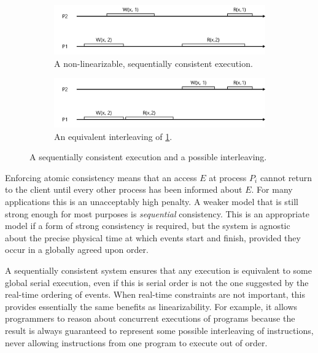 \documentclass[]             %
{NASA}                       %
\theoremstyle{definition}
\begin{document}
\begin{figure}
     \begin{subfigure}[a]{1\textwidth}
         \center
         \includegraphics[scale=0.4]{images/sequential1.png}
         \caption{A non-linearizable, sequentially consistent execution.}
         \label{fig:sequential1}
     \end{subfigure}
     \begin{subfigure}[b]{1\textwidth}
         \center
         \includegraphics[scale=0.4]{images/sequential2.png}
         \caption{An equivalent interleaving of \ref{fig:sequential1}.}
         \label{fig:interleaving1}
     \end{subfigure}
     \caption{A sequentially consistent execution and a possible interleaving.}
     \label{fig:sequential}
\end{figure}

Enforcing atomic consistency means that an access \(E\) at process
\(P_i\) cannot return to the client until every other process has been
informed about \(E\). For many applications this is an unacceptably high
penalty. A weaker model that is still strong enough for most purposes is
\emph{sequential} consistency. This is an appropriate model if a form of
strong consistency is required, but the system is agnostic about the
precise physical time at which events start and finish, provided they
occur in a globally agreed upon order.

A sequentially consistent system ensures that any execution is
equivalent to some global serial execution, even if this is serial order
is not the one suggested by the real-time ordering of events. When
real-time constraints are not important, this provides essentially the
same benefits as linearizability. For example, it allows programmers to
reason about concurrent executions of programs because the result is
always guaranteed to represent some possible interleaving of
instructions, never allowing instructions from one program to execute
out of order.
\end{document}
